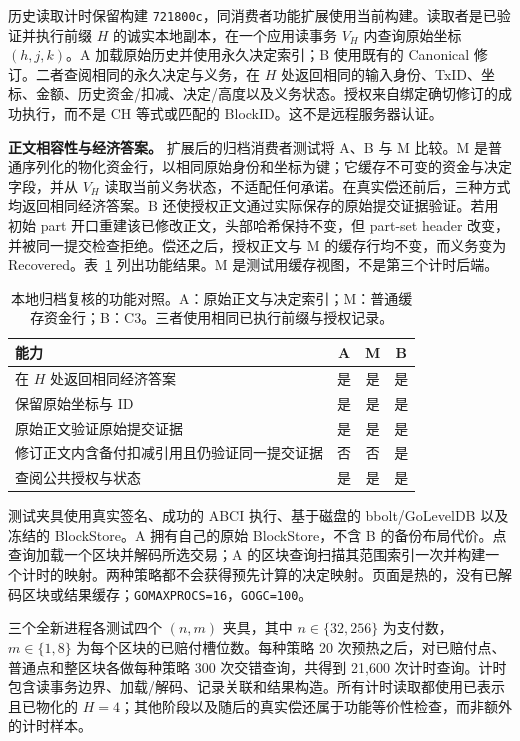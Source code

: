 历史读取计时保留构建 \texttt{721800c}，同消费者功能扩展使用当前构建。读取者是已验证并执行前缀 $H$ 的诚实本地副本，在一个应用读事务 $V_H$ 内查询原始坐标 $(h,j,k)$。A 加载原始历史并使用永久决定索引；B 使用既有的 Canonical 修订。二者查阅相同的永久决定与义务，在 $H$ 处返回相同的输入身份、TxID、坐标、金额、历史资金/扣减、决定/高度以及义务状态。授权来自绑定确切修订的成功执行，而不是 CH 等式或匹配的 BlockID。这不是远程服务器认证。


\noindent\textbf{正文相容性与经济答案。}
扩展后的归档消费者测试将 A、B 与 M 比较。M 是普通序列化的物化资金行，以相同原始身份和坐标为键；它缓存不可变的资金与决定字段，并从 $V_H$ 读取当前义务状态，不适配任何承诺。在真实偿还前后，三种方式均返回相同经济答案。B 还使授权正文通过实际保存的原始提交证据验证。若用初始 part 开口重建该已修改正文，头部哈希保持不变，但 part-set header 改变，并被同一提交检查拒绝。偿还之后，授权正文与 M 的缓存行均不变，而义务变为 Recovered。表~\ref{tab:c3-function} 列出功能结果。M 是测试用缓存视图，不是第三个计时后端。

\begin{table}[t]
  \centering
  \caption{本地归档复核的功能对照。A：原始正文与决定索引；M：普通缓存资金行；B：C3。三者使用相同已执行前缀与授权记录。}
  \label{tab:c3-function}
  \small
  \begin{tabular}{@{}p{}ccc@{}}
    \toprule
    能力 & A & M & B \\
    \midrule
    在 $H$ 处返回相同经济答案 & 是 & 是 & 是 \\
    保留原始坐标与 ID & 是 & 是 & 是 \\
    原始正文验证原始提交证据 & 是 & 是 & 是 \\
    修订正文内含备付扣减引用且仍验证同一提交证据 & 否 & 否 & 是 \\
    查阅公共授权与状态 & 是 & 是 & 是 \\
    \bottomrule
  \end{tabular}
\end{table}

测试夹具使用真实签名、成功的 ABCI 执行、基于磁盘的 bbolt/GoLevelDB 以及冻结的 BlockStore。A 拥有自己的原始 BlockStore，不含 B 的备份布局代价。点查询加载一个区块并解码所选交易；A 的区块查询扫描其范围索引一次并构建一个计时的映射。两种策略都不会获得预先计算的决定映射。页面是热的，没有已解码区块或结果缓存；\texttt{GOMAXPROCS=16}，\texttt{GOGC=100}。

三个全新进程各测试四个 $(n,m)$ 夹具，其中 $n\in\{32,256\}$ 为支付数，$m\in\{1,8\}$ 为每个区块的已赔付槽位数。每种策略 20 次预热之后，对已赔付点、普通点和整区块各做每种策略 300 次交错查询，共得到 21,600 次计时查询。计时包含读事务边界、加载/解码、记录关联和结果构造。所有计时读取都使用已表示且已物化的 $H=4$；其他阶段以及随后的真实偿还属于功能等价性检查，而非额外的计时样本。


